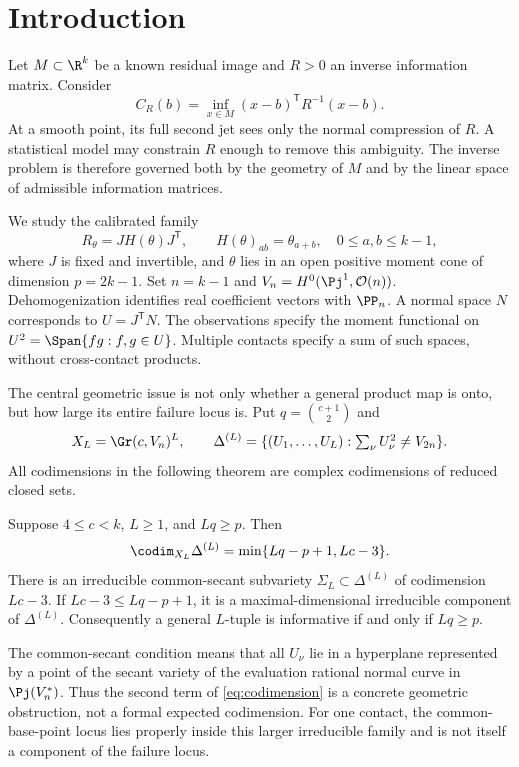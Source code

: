 \section{Introduction}
Let $M\subset\R^k$ be a known residual image and $R>0$ an inverse information matrix. Consider
\begin{equation}\label{eq:distance}
 C_R(b)=\inf_{x\in M}(x-b)^{\mathsf T}R^{-1}(x-b).
\end{equation}
At a smooth point, its full second jet sees only the normal compression of $R$. A statistical model may constrain $R$ enough to remove this ambiguity. The inverse problem is therefore governed both by the geometry of $M$ and by the linear space of admissible information matrices.

We study the calibrated family
\[
 R_\theta=JH(\theta)J^{\mathsf T},\qquad
 H(\theta)_{ab}=\theta_{a+b},\quad 0\le a,b\le k-1,
\]
where $J$ is fixed and invertible, and $\theta$ lies in an open positive moment cone of dimension $p=2k-1$. Set $n=k-1$ and $V_n=H^0(\Pj^1,\mathcal O(n))$. Dehomogenization identifies real coefficient vectors with $\PP_n$. A normal space $N$ corresponds to $U=J^{\mathsf T}N$. The observations specify the moment functional on $U^2=\Span\{fg:f,g\in U\}$. Multiple contacts specify a sum of such spaces, without cross-contact products.

The central geometric issue is not only whether a general product map is onto, but how large its entire failure locus is. Put $q=\binom{c+1}{2}$ and
\[
 X_L=\Gr(c,V_n)^L,\qquad
 \Delta^{(L)}=\{(U_1,\ldots,U_L):\textstyle\sum_\nu U_\nu^2\ne V_{2n}\}.
\]
All codimensions in the following theorem are complex codimensions of reduced closed sets.
\begin{theorem}\label{thm:global-intro}
Suppose $4\le c<k$, $L\ge1$, and $Lq\ge p$. Then
\begin{equation}\label{eq:codimension}
 \codim_{X_L}\Delta^{(L)}=\min\{Lq-p+1,Lc-3\}.
\end{equation}
There is an irreducible common-secant subvariety $\Sigma_L\subset\Delta^{(L)}$ of codimension $Lc-3$. If $Lc-3\le Lq-p+1$, it is a maximal-dimensional irreducible component of $\Delta^{(L)}$. Consequently a general $L$-tuple is informative if and only if $Lq\ge p$.
\end{theorem}
The common-secant condition means that all $U_\nu$ lie in a hyperplane represented by a point of the secant variety of the evaluation rational normal curve in $\Pj(V_n^*)$. Thus the second term of \eqref{eq:codimension} is a concrete geometric obstruction, not a formal expected codimension. For one contact, the common-base-point locus lies properly inside this larger irreducible family and is not itself a component of the failure locus.


